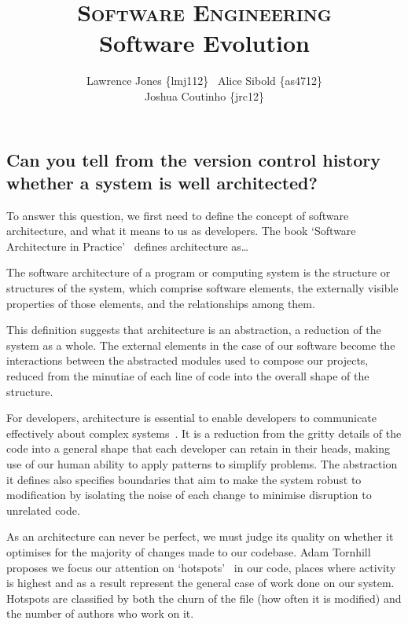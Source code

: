 \documentclass[11pt]{article}
\title{\textsc{Software Engineering}\\Software Evolution}
\author{Lawrence Jones \{lmj112\} \  Alice Sibold \{as4712\} \\
        Joshua Coutinho \{jrc12\}}
\date{}
\begin{document}
\maketitle


\subsection*{Can you tell from the version control history whether a system is
well architected?}

To answer this question, we first need to define the concept of software
architecture, and what it means to us as developers. The book `Software
Architecture in Practice'~\cite{softwareArchitectureInPractice} defines
architecture as\dots

\begin{displayquote}
The software architecture of a program or computing system is the structure or
structures of the system, which comprise software elements, the externally
visible properties of those elements, and the relationships among them.
\end{displayquote}

This definition suggests that architecture is an abstraction, a reduction of the
system as a whole. The external elements in the case of our software become the
interactions between the abstracted modules used to compose our projects,
reduced from the minutiae of each line of code into the overall shape of the
structure.

For developers, architecture is essential to enable developers to communicate
effectively about complex systems~\cite{anIntroductionToSoftwareArchitecture}.
It is a reduction from the gritty details of the code into a general shape that
each developer can retain in their heads, making use of our human ability to
apply patterns to simplify problems. The abstraction it defines also specifies
boundaries that aim to make the system robust to modification by isolating the
noise of each change to minimise disruption to unrelated code.

As an architecture can never be perfect, we must judge its quality on whether
it optimises for the majority of changes made to our codebase. Adam Tornhill
proposes we focus our attention on `hotspots'~\cite{codeAsCrimeScene} in our
code, places where activity is highest and as a result represent the general
case of work done on our system. Hotspots are classified by both the churn of
the file (how often it is modified) and the number of authors who work on it.
\end{document}
